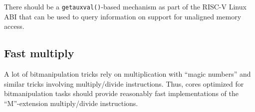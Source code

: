 There should be a {\tt getauxval()}-based mechanism as part of the RISC-V Linux
ABI that can be used to query information on support for unaligned memory
access.~\cite{FastLdSt}

\subsection{Fast multiply}

A lot of bitmanipulation tricks rely on multiplication with ``magic numbers'' and
similar tricks involving multiply/divide instructions. Thus, cores optimized for
bitmanipulation tasks should provide reasonably fast implementations of the
``M''-extension multiply/divide instructions.


